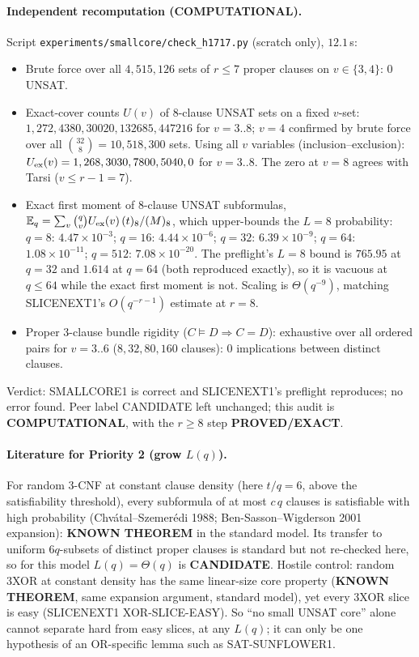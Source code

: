 \documentclass[11pt]{article}
\begin{document}
\paragraph{Independent recomputation (COMPUTATIONAL).} Script \texttt{experiments/smallcore/check\_h1717.py} (scratch only), $12.1$\,s:
\begin{itemize}
\item Brute force over all $4{,}515{,}126$ sets of $r\le7$ proper clauses on $v\in\{3,4\}$: $0$ UNSAT.
\item Exact-cover counts $U(v)$ of 8-clause UNSAT sets on a fixed $v$-set: $1,272,4380,30020,132685,447216$ for $v=3..8$;
$v=4$ confirmed by brute force over all $\binom{32}{8}=10{,}518{,}300$ sets. Using all $v$ variables (inclusion--exclusion):
$U_{\rm ex}(v)=1,268,3030,7800,5040,0$ for $v=3..8$. The zero at $v=8$ agrees with Tarsi ($v\le r-1=7$).
\item Exact first moment of 8-clause UNSAT subformulas,
$\mathbb E_q=\sum_v\binom qv U_{\rm ex}(v)\,(t)_8/(M)_8$, which upper-bounds the $L=8$ probability:
$q=8$: $4.47\times10^{-3}$; $q=16$: $4.44\times10^{-6}$; $q=32$: $6.39\times10^{-9}$; $q=64$: $1.08\times10^{-11}$; $q=512$: $7.08\times10^{-20}$.
The preflight's $L=8$ bound is $765.95$ at $q=32$ and $1.614$ at $q=64$ (both reproduced exactly), so it is vacuous at $q\le64$
while the exact first moment is not. Scaling is $\Theta(q^{-9})$, matching SLICENEXT1's $O(q^{-r-1})$ estimate at $r=8$.
\item Proper 3-clause bundle rigidity ($C\models D\Rightarrow C=D$): exhaustive over all ordered pairs for $v=3..6$
($8,32,80,160$ clauses): $0$ implications between distinct clauses.
\end{itemize}
Verdict: SMALLCORE1 is correct and SLICENEXT1's preflight reproduces; no error found. Peer label CANDIDATE left unchanged;
this audit is \textbf{COMPUTATIONAL}, with the $r\ge8$ step \textbf{PROVED/EXACT}.

\paragraph{Literature for Priority 2 (grow $L(q)$).} For random 3-CNF at constant clause density (here $t/q=6$, above the
satisfiability threshold), every subformula of at most $c\,q$ clauses is satisfiable with high probability
(Chv\'atal--Szemer\'edi 1988; Ben-Sasson--Wigderson 2001 expansion): \textbf{KNOWN THEOREM} in the standard model.
Its transfer to uniform $6q$-subsets of distinct proper clauses is standard but not re-checked here, so for this model $L(q)=\Theta(q)$ is
\textbf{CANDIDATE}. Hostile control: random 3XOR at constant density has the same linear-size core property (\textbf{KNOWN THEOREM}, same expansion argument, standard model), yet every 3XOR slice
is easy (SLICENEXT1 XOR-SLICE-EASY). So ``no small UNSAT core'' alone cannot separate hard from easy slices, at any $L(q)$;
it can only be one hypothesis of an OR-specific lemma such as SAT-SUNFLOWER1.
\end{document}
